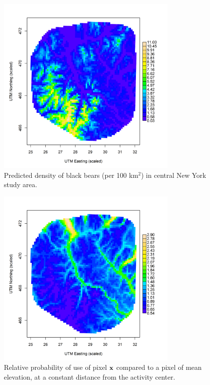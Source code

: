 \begin{figure}
\centering
\includegraphics[width=3.5in,height=3.5in]{Ch13-RSF/figs/density2.png}
\caption{Predicted density of black bears (per 100 km$^2$) in central New York study
  area.
}
\label{fig.density}
\end{figure}


\begin{figure}
\centering
\includegraphics[width=3.5in,height=3.5in]{Ch13-RSF/figs/spaceusage2.png}
\caption{Relative probability of use of pixel ${\bf x}$ compared to a pixel
  of mean elevation, at a constant distance from the activity center.
}
\label{fig.spaceusage}
\end{figure}


